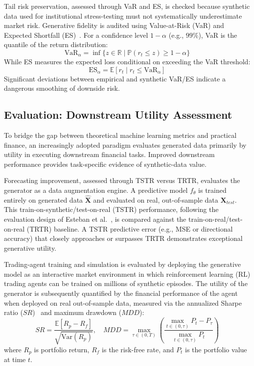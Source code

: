 Tail risk preservation, assessed through VaR and ES, is checked because synthetic data used for institutional stress-testing must not systematically underestimate market risk. Generative fidelity is audited using Value-at-Risk (VaR) and Expected Shortfall (ES)~\citep{acerbi2002coherence,acerbi2014expected}. For a confidence level $1 - \alpha$ (e.g., $99\%$), VaR is the quantile of the return distribution:
    \begin{equation}
        \text{VaR}_\alpha = \inf \{ z \in \mathbb{R} \mid \mathbb{P}(r_t \le z) \ge 1 - \alpha \}
    \end{equation}
While ES measures the expected loss conditional on exceeding the VaR threshold:
    \begin{equation}
        \text{ES}_\alpha = \mathbb{E}[r_t \mid r_t \le \text{VaR}_\alpha]
    \end{equation}
Significant deviations between empirical and synthetic VaR/ES indicate a dangerous smoothing of downside risk.

\subsection{Evaluation: Downstream Utility Assessment}
To bridge the gap between theoretical machine learning metrics and practical finance, an increasingly adopted paradigm evaluates generated data primarily by utility in executing downstream financial tasks. Improved downstream performance provides task-specific evidence of synthetic-data value.

Forecasting improvement, assessed through TSTR versus TRTR, evaluates the generator as a data augmentation engine. A predictive model $f_\theta$ is trained entirely on generated data $\hat{\mathbf{X}}$ and evaluated on real, out-of-sample data $\mathbf{X}_{test}$. This train-on-synthetic/test-on-real (TSTR) performance, following the evaluation design of Esteban et al.~\citep{esteban2017real}, is compared against the train-on-real/test-on-real (TRTR) baseline. A TSTR predictive error (e.g., MSE or directional accuracy) that closely approaches or surpasses TRTR demonstrates exceptional generative utility.

Trading-agent training and simulation is evaluated by deploying the generative model as an interactive market environment in which reinforcement learning (RL) trading agents can be trained on millions of synthetic episodes. The utility of the generator is subsequently quantified by the financial performance of the agent when deployed on real out-of-sample data, measured via the annualized Sharpe ratio ($SR$)~\citep{sharpe1994sharpe} and maximum drawdown ($MDD$):
    \begin{equation}
        SR = \frac{\mathbb{E}[R_p - R_f]}{\sqrt{\text{Var}(R_p)}}, \quad MDD = \max_{\tau \in (0, T)} \left( \frac{\max_{t \in (0, \tau)} P_t - P_\tau}{\max_{t \in (0, \tau)} P_t} \right)
    \end{equation}
    where $R_p$ is portfolio return, $R_f$ is the risk-free rate, and $P_t$ is the portfolio value at time $t$.

